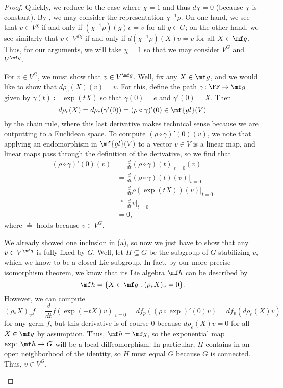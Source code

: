 \documentclass[../notes.tex]{subfiles}
\begin{document}
\begin{proof}
	Quickly, we reduce to the case where $\chi=1$ and thus $d\chi=0$ (because $\chi$ is constant). By , we may consider the representation $\chi^{-1}\rho$. On one hand, we see that $v\in V^\chi$ if and only if $\left(\chi^{-1}\rho\right)(g)v=v$ for all $g\in G$; on the other hand, we see similarly that $v\in V^{d\chi}$ if and only if $d\left(\chi^{-1}\rho\right)(X)v=v$ for all $X\in\mf g$. Thus, for our arguments, we will take $\chi=1$ so that we may consider $V^G$ and $V^{\mf g}$.
	\begin{listalph}
		\item For $v\in V^G$, we must show that $v\in V^{\mf g}$. Well, fix any $X\in\mf g$, and we would like to show that $d\rho_e(X)(v)=v$. For this, define the path $\gamma\colon\FF\to\mf g$ given by $\gamma(t)\coloneqq\exp(tX)$ so that $\gamma(0)=e$ and $\gamma'(0)=X$. Then
		\[d\rho_e(X)=d\rho_e(\gamma'(0))=(\rho\circ\gamma)'(0)\in\mf{gl}(V)\]
		by the chain rule, where this last derivative makes technical sense because we are outputting to a Euclidean space. To compute $(\rho\circ\gamma)'(0)(v)$, we note that applying an endomorphism in $\mf{gl}(V)$ to a vector $v\in V$ is a linear map, and linear maps pass through the definition of the derivative, so we find that
		\begin{align*}
			(\rho\circ\gamma)'(0)(v) &= \frac d{dt}(\rho\circ\gamma)(t)\bigg|_{t=0}(v) \\
			&= \frac d{dt}(\rho\circ\gamma)(t)(v)\bigg|_{t=0} \\
			&= \frac d{dt}\rho(\exp(tX))(v)\bigg|_{t=0} \\
			&\stackrel*= \frac d{dt}v\bigg|_{t=0} \\
			&= 0,
		\end{align*}
		where $\stackrel*=$ holds because $v\in V^G$.
		\item We already showed one inclusion in (a), so now we just have to show that any $v\in V^{\mf g}$ is fully fixed by $G$. Well, let $H\subseteq G$ be the subgroup of $G$ stabilizing $v$, which we know to be a closed Lie subgroup. In fact, by our more precise isomorphism theorem, we know that its Lie algebra $\mf h$ can be described by
		\[\mf h=\{X\in\mf g:(\rho_*X)_v=0\}.\]
		However, we can compute
		\[(\rho_*X)_vf=\frac d{dt}f(\exp(-tX)v)\bigg|_{t=0}=df_p((\rho\circ\exp)'(0)v)=df_p(d\rho_e(X)v)\]
		for any germ $f$, but this derivative is of course $0$ because $d\rho_e(X)v=0$ for all $X\in\mf g$ by assumption. Thus, $\mf h=\mf g$, so the exponential map $\exp\colon\mf h\to G$ will be a local diffeomorphism. In particular, $H$ contains in an open neighborhood of the identity, so $H$ must equal $G$ because $G$ is connected. Thus, $v\in V^G$.
		\qedhere
	\end{listalph}
\end{proof}
\end{document}
